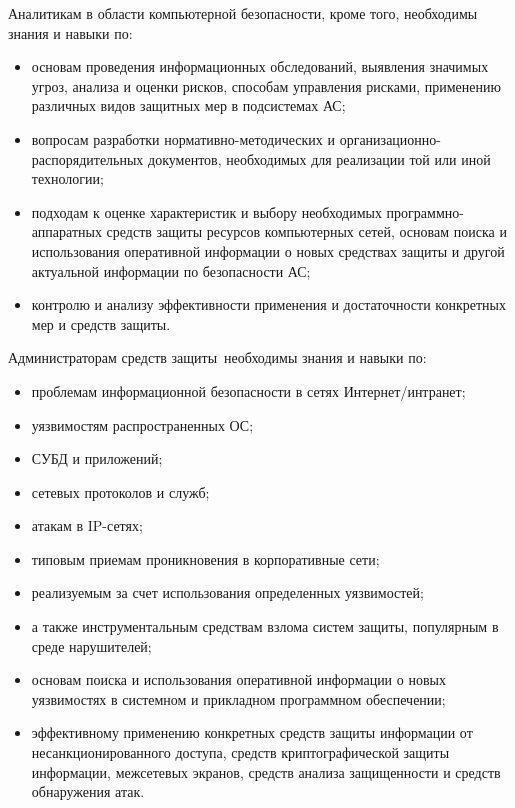 Аналитикам в области компьютерной безопасности, кроме того, необходимы знания и навыки по:
\begin{itemize}
\item основам проведения информационных обследований, выявления значимых угроз,
анализа и оценки рисков, способам управления рисками,
применению различных видов защитных мер в подсистемах АС;
\item вопросам разработки нормативно-методических и организационно-распорядительных
документов, необходимых для реализации той или иной технологии;
\item подходам к оценке характеристик и выбору необходимых программно-аппаратных
средств защиты ресурсов компьютерных сетей, основам поиска и использования
оперативной информации о новых средствах защиты и другой
актуальной информации по безопасности АС;
\item контролю и анализу эффективности применения и достаточности конкретных мер и средств защиты.
\end{itemize}

Администраторам средств защиты необходимы знания и навыки по:
\begin{itemize}
\item проблемам информационной безопасности в сетях Интернет/интранет;
\item уязвимостям распространенных ОС;
\item СУБД и приложений;
\item сетевых протоколов и служб;
\item атакам в IP-сетях;
\item типовым приемам проникновения в корпоративные сети;
\item реализуемым за счет использования определенных уязвимостей;
\item а также инструментальным средствам взлома систем защиты, популярным в среде нарушителей;
\item основам поиска и использования оперативной информации о новых уязвимостях в системном и прикладном программном обеспечении;
\item эффективному применению конкретных средств защиты информации от несанкционированного доступа, средств криптографической защиты информации, межсетевых экранов, средств анализа защищенности и средств обнаружения атак.
\end{itemize}
